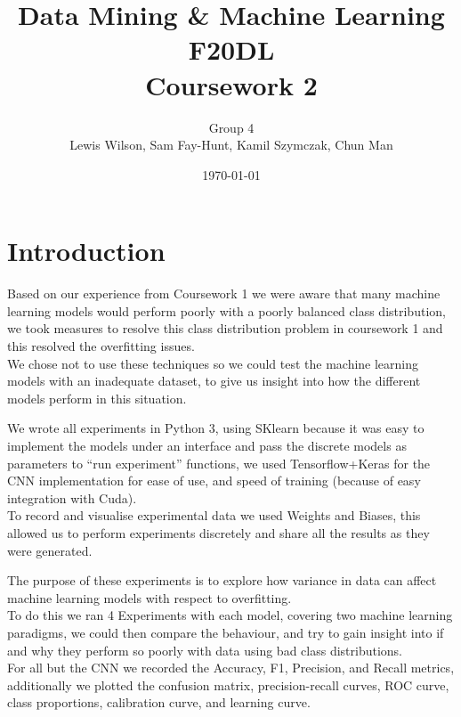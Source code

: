 \documentclass[11pt]{article}
\begin{document}
\title{\huge Data Mining \& Machine Learning F20DL \\ Coursework 2} 
\author{Group 4\\Lewis Wilson, Sam Fay-Hunt, Kamil Szymczak, Chun Man }
\date{\today}
\maketitle

\newpage
\tableofcontents
\thispagestyle{empty}
\pagebreak
\setcounter{page}{1}
\newpage
\section{Introduction}
Based on our experience from Coursework 1 we were aware that many machine learning models would perform poorly with a poorly balanced class distribution, we took measures to resolve this class distribution problem in coursework 1 and this resolved the overfitting issues.\\
We chose not to use these techniques so we could test the machine learning models with an inadequate dataset, to give us insight into how the different models perform in this situation.

We wrote all experiments in Python 3, using SKlearn because it was easy to implement the models under an interface and pass the discrete models as parameters to “run experiment” functions, we used Tensorflow+Keras for the CNN implementation for ease of use, and speed of training (because of easy integration with Cuda). \\
To record and visualise experimental data we used Weights and Biases, this allowed us to perform experiments discretely and share all the results as they were generated.

The purpose of these experiments is to explore how variance in data can affect machine learning models with respect to overfitting. \\
To do this we ran 4 Experiments with each model, covering two machine learning paradigms, we could then compare the behaviour, and try to gain insight into if and why they perform so poorly with data using bad class distributions.\\
For all but the CNN we recorded the Accuracy, F1, Precision, and Recall metrics, additionally we plotted the confusion matrix, precision-recall curves, ROC curve, class proportions, calibration curve, and learning curve.
\end{document}

